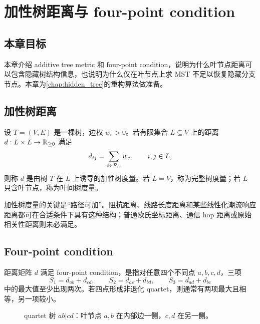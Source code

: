 \chapter{加性树距离与 four-point condition}
\label{chap:four_point}

\section*{本章目标}
本章介绍 additive tree metric 和 four-point condition，说明为什么叶节点距离可以包含隐藏树结构信息，也说明为什么仅在叶节点上求 MST 不足以恢复隐藏分支节点。本章为\cref{chap:hidden_tree}的重构算法做准备。

\section{加性树距离}

\begin{definition}[加性树度量]
设 $T=(V,E)$ 是一棵树，边权 $w_e>0$。若有限集合 $L\subseteq V$ 上的距离 $d:L\times L\to \mathbb{R}_{\ge 0}$ 满足
\begin{equation}
  d_{ij}=\sum_{e\in \mathcal{P}_{ij}}w_e,\qquad i,j\in L,
\end{equation}
则称 $d$ 是由树 $T$ 在 $L$ 上诱导的加性树度量。若 $L=V$，称为完整树度量；若 $L$ 只含叶节点，称为叶间树度量。
\end{definition}

加性树度量的关键是“路径可加”。阻抗距离、线路长度距离和某些线性化潮流响应距离都可在合适条件下具有这种结构；普通欧氏坐标距离、通信 hop 距离或原始相关性距离则未必满足。

\section{Four-point condition}

\begin{definition}
距离矩阵 $d$ 满足 four-point condition，是指对任意四个不同点 $a,b,c,d$，三项
\begin{equation}
  S_1=d_{ab}+d_{cd},\qquad
  S_2=d_{ac}+d_{bd},\qquad
  S_3=d_{ad}+d_{bc}
\end{equation}
中的最大值至少出现两次。若四点形成非退化 quartet，则通常有两项最大且相等，另一项较小。
\end{definition}

\begin{figure}[htbp]
  \centering
  
  \caption{quartet 树 $ab|cd$：叶节点 $a,b$ 在内部边一侧，$c,d$ 在另一侧。}
  \label{fig:quartet}
\end{figure}

